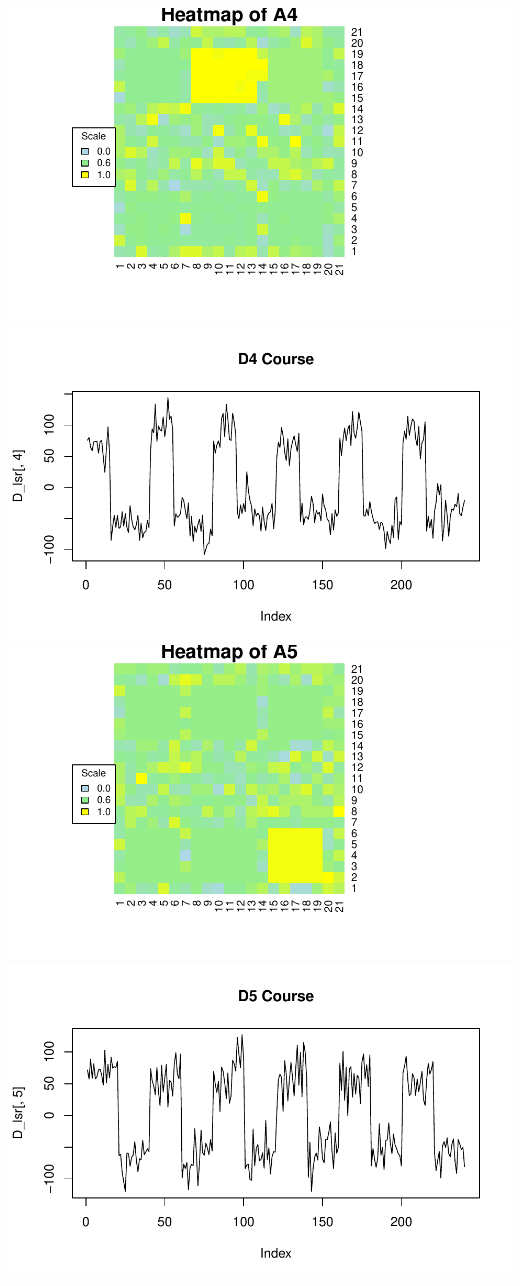\documentclass[11pt]{article}
\begin{document}
\includegraphics[width=.45\linewidth]{plots/A4_heatmap.pdf}
\includegraphics[width=.45\linewidth]{plots/D4_line.pdf}\\

\includegraphics[width=.45\linewidth]{plots/A5_heatmap.pdf}
\includegraphics[width=.45\linewidth]{plots/D5_line.pdf}\\
\end{document}
